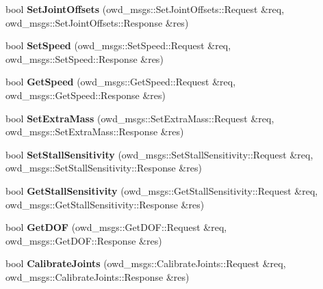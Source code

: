 \begin{DoxyCompactItemize}
\item 
\hypertarget{classOWD_1_1WamDriver_aadd177e2a03c60a64dfa9aaac3cff7ce}{bool {\bfseries Set\-Joint\-Offsets} (owd\-\_\-msgs\-::\-Set\-Joint\-Offsets\-::\-Request \&req, owd\-\_\-msgs\-::\-Set\-Joint\-Offsets\-::\-Response \&res)}\label{classOWD_1_1WamDriver_aadd177e2a03c60a64dfa9aaac3cff7ce}

\item 
\hypertarget{classOWD_1_1WamDriver_a984046c077389c4512a61cbc24005371}{bool {\bfseries Set\-Speed} (owd\-\_\-msgs\-::\-Set\-Speed\-::\-Request \&req, owd\-\_\-msgs\-::\-Set\-Speed\-::\-Response \&res)}\label{classOWD_1_1WamDriver_a984046c077389c4512a61cbc24005371}

\item 
\hypertarget{classOWD_1_1WamDriver_a4d4eb5a53e098372c852cf5fa8425a2a}{bool {\bfseries Get\-Speed} (owd\-\_\-msgs\-::\-Get\-Speed\-::\-Request \&req, owd\-\_\-msgs\-::\-Get\-Speed\-::\-Response \&res)}\label{classOWD_1_1WamDriver_a4d4eb5a53e098372c852cf5fa8425a2a}

\item 
\hypertarget{classOWD_1_1WamDriver_ab20f12a316dcbc11f3406549d26b6c4d}{bool {\bfseries Set\-Extra\-Mass} (owd\-\_\-msgs\-::\-Set\-Extra\-Mass\-::\-Request \&req, owd\-\_\-msgs\-::\-Set\-Extra\-Mass\-::\-Response \&res)}\label{classOWD_1_1WamDriver_ab20f12a316dcbc11f3406549d26b6c4d}

\item 
\hypertarget{classOWD_1_1WamDriver_a0065001e7d51270ba79db365886282bb}{bool {\bfseries Set\-Stall\-Sensitivity} (owd\-\_\-msgs\-::\-Set\-Stall\-Sensitivity\-::\-Request \&req, owd\-\_\-msgs\-::\-Set\-Stall\-Sensitivity\-::\-Response \&res)}\label{classOWD_1_1WamDriver_a0065001e7d51270ba79db365886282bb}

\item 
\hypertarget{classOWD_1_1WamDriver_a96afd22bdec4da39c3807c65f9f31448}{bool {\bfseries Get\-Stall\-Sensitivity} (owd\-\_\-msgs\-::\-Get\-Stall\-Sensitivity\-::\-Request \&req, owd\-\_\-msgs\-::\-Get\-Stall\-Sensitivity\-::\-Response \&res)}\label{classOWD_1_1WamDriver_a96afd22bdec4da39c3807c65f9f31448}

\item 
\hypertarget{classOWD_1_1WamDriver_aae2a8eba423140353c6d869f2b4ea174}{bool {\bfseries Get\-D\-O\-F} (owd\-\_\-msgs\-::\-Get\-D\-O\-F\-::\-Request \&req, owd\-\_\-msgs\-::\-Get\-D\-O\-F\-::\-Response \&res)}\label{classOWD_1_1WamDriver_aae2a8eba423140353c6d869f2b4ea174}

\item 
\hypertarget{classOWD_1_1WamDriver_a0dead50cda5ec7553558ec63b13e624d}{bool {\bfseries Calibrate\-Joints} (owd\-\_\-msgs\-::\-Calibrate\-Joints\-::\-Request \&req, owd\-\_\-msgs\-::\-Calibrate\-Joints\-::\-Response \&res)}\label{classOWD_1_1WamDriver_a0dead50cda5ec7553558ec63b13e624d}


\end{DoxyCompactItemize}
